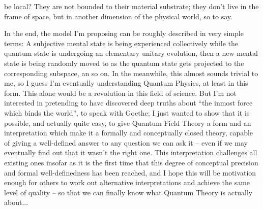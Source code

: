 be local? They are not bounded to their material substrate; they don't live in the frame of space, but in another dimension of the physical world, so to say.

In the end, the model I'm proposing can be roughly described in very simple terms: A subjective mental state is being experienced collectively while the quantum state is undergoing an elementary unitary evolution, then a new mental state is being randomly moved to as the quantum state gets projected to the corresponding subspace, an so on. In the meanwhile, this almost sounds trivial to me, so I guess I'm eventually understanding Quantum Physics, at least in this form. This alone would be a revolution in this field of science. But I'm not interested in pretending to have discovered deep truths about ``the inmost force which binds the world'', to speak with Goethe; I just wanted to show that it is possible, and actually quite easy, to give Quantum Field Theory a form and an interpretation which make it a formally and conceptually closed theory, capable of giving a well-defined answer to any question we can ask it -- even if we may eventually find out that it wasn't the right one. This interpretation challenges all existing ones insofar as it is the first time that this degree of conceptual precision and formal well-definedness has been reached, and I hope this will be motivation enough for others to work out alternative interpretations and achieve the same level of quality -- so that we can finally know what Quantum Theory is actually about...
